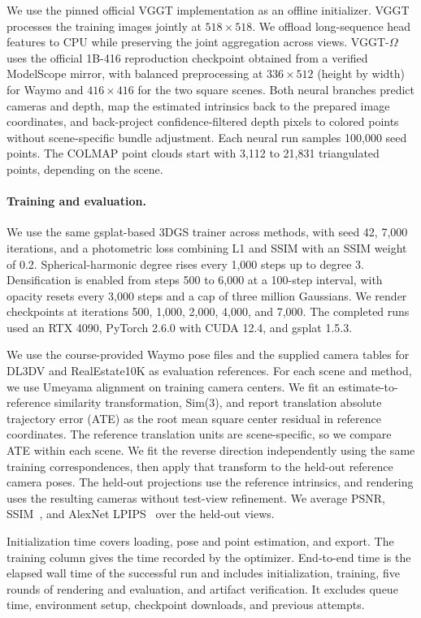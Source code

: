 We use the pinned official VGGT implementation as an offline initializer. VGGT processes the training images jointly at $518\times518$. We offload long-sequence head features to CPU while preserving the joint aggregation across views. VGGT-$\Omega$ uses the official 1B-416 reproduction checkpoint obtained from a verified ModelScope mirror, with balanced preprocessing at $336\times512$ (height by width) for Waymo and $416\times416$ for the two square scenes. Both neural branches predict cameras and depth, map the estimated intrinsics back to the prepared image coordinates, and back-project confidence-filtered depth pixels to colored points without scene-specific bundle adjustment. Each neural run samples 100,000 seed points. The COLMAP point clouds start with 3,112 to 21,831 triangulated points, depending on the scene.

\paragraph{Training and evaluation.}
We use the same gsplat-based 3DGS trainer across methods, with seed 42, 7,000 iterations, and a photometric loss combining L1 and SSIM with an SSIM weight of 0.2. Spherical-harmonic degree rises every 1,000 steps up to degree 3. Densification is enabled from steps 500 to 6,000 at a 100-step interval, with opacity resets every 3,000 steps and a cap of three million Gaussians. We render checkpoints at iterations 500, 1,000, 2,000, 4,000, and 7,000. The completed runs used an RTX 4090, PyTorch 2.6.0 with CUDA 12.4, and gsplat 1.5.3.

We use the course-provided Waymo pose files and the supplied camera tables for DL3DV and RealEstate10K as evaluation references. For each scene and method, we use Umeyama alignment on training camera centers. We fit an estimate-to-reference similarity transformation, Sim(3), and report translation absolute trajectory error (ATE) as the root mean square center residual in reference coordinates. The reference translation units are scene-specific, so we compare ATE within each scene. We fit the reverse direction independently using the same training correspondences, then apply that transform to the held-out reference camera poses. The held-out projections use the reference intrinsics, and rendering uses the resulting cameras without test-view refinement. We average PSNR, SSIM~\cite{wang2004ssim}, and AlexNet LPIPS~\cite{zhang2018lpips} over the held-out views.

Initialization time covers loading, pose and point estimation, and export. The training column gives the time recorded by the optimizer. End-to-end time is the elapsed wall time of the successful run and includes initialization, training, five rounds of rendering and evaluation, and artifact verification. It excludes queue time, environment setup, checkpoint downloads, and previous attempts.

